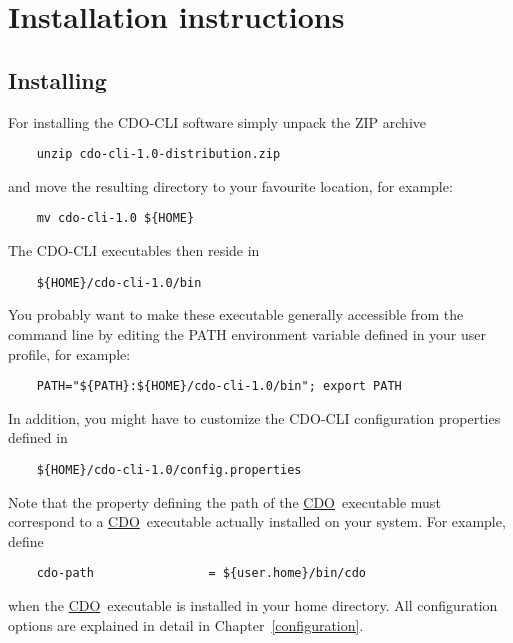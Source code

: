 \documentclass[
square
,pdftex
]{refrep}
\newcommand{\cdo}{\href{http://www.mpimet.mpg.de/cdo/}{CDO}}
\begin{document}
\section{Installation instructions}

\subsection{Installing}
For installing the CDO-CLI software simply unpack the ZIP archive 

\begin{verbatim}
    unzip cdo-cli-1.0-distribution.zip
\end{verbatim}

and move the resulting directory to your favourite location, for example: 

\begin{verbatim}
    mv cdo-cli-1.0 ${HOME}
\end{verbatim}

The CDO-CLI executables then reside in

\begin{verbatim}
    ${HOME}/cdo-cli-1.0/bin
\end{verbatim}

You probably want to make these executable generally accessible from the command
line by editing the PATH environment variable defined in your user profile, for
example:

\begin{verbatim}
    PATH="${PATH}:${HOME}/cdo-cli-1.0/bin"; export PATH
\end{verbatim}

In addition, you might have to customize the CDO-CLI configuration properties
defined in

\begin{verbatim}
    ${HOME}/cdo-cli-1.0/config.properties
\end{verbatim}

\attention
Note that the property defining the path of the \cdo\ executable must correspond
to a \cdo\ executable actually installed on your system. For example, define

\begin{verbatim}
    cdo-path                = ${user.home}/bin/cdo
\end{verbatim}

when the \cdo\ executable is installed in your home directory. All configuration
options are explained in detail in Chapter~\ref{configuration}.
\end{document}
